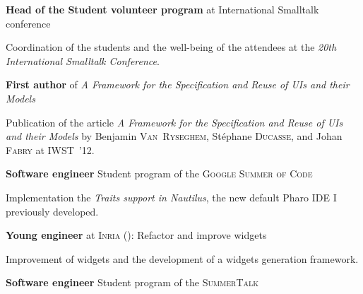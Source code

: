 \begin{rubric}{
}

\entry*[August 2012] \textbf{Head of the Student volunteer program} at International Smalltalk conference

\medskip

Coordination of the students and the well-being of the attendees at the \emph{20th International Smalltalk Conference}.


\entry*[August 2012] \textbf{First author} of \emph{A Framework for the Specification and Reuse of UIs and their Models}

\medskip

Publication of the article \emph{A Framework for the Specification and Reuse of UIs and their Models} by Benjamin \textsc{Van~Ryseghem}, Stéphane \textsc{Ducasse}, and Johan \textsc{Fabry} at IWST~'12.

 \textbf{Software engineer} Student program of the \textsc{Google Summer of Code}

\medskip

Implementation the \emph{Traits support in Nautilus}, the new default Pharo IDE I previously developed.

 \textbf{Young engineer} at \textsc{Inria} (): Refactor and improve widgets

\medskip

Improvement of widgets and the development of a widgets generation framework.


\entry*[Summer 2011] \textbf{Software engineer} Student program of the \textsc{SummerTalk}


\end{rubric}
